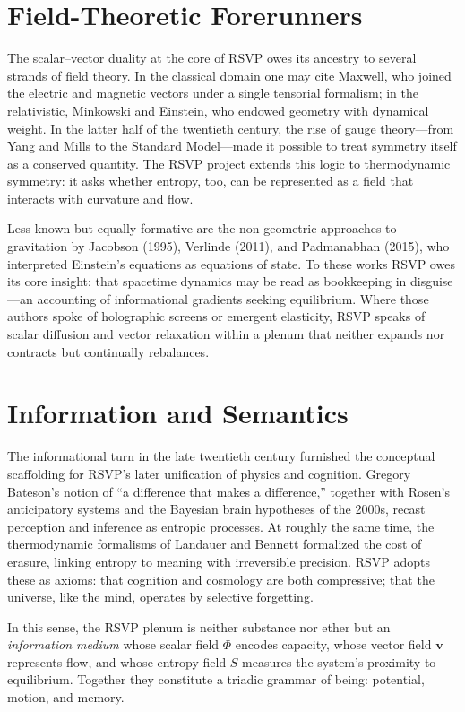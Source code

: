 \documentclass[12pt]{article}
\begin{document}
\section{Field-Theoretic Forerunners}

The scalar--vector duality at the core of RSVP owes its ancestry to several strands of field theory. 
In the classical domain one may cite Maxwell, who joined the electric and magnetic vectors under a single tensorial formalism; in the relativistic, Minkowski and Einstein, who endowed geometry with dynamical weight. 
In the latter half of the twentieth century, the rise of gauge theory---from Yang and Mills to the Standard Model---made it possible to treat symmetry itself as a conserved quantity. 
The RSVP project extends this logic to thermodynamic symmetry: it asks whether entropy, too, can be represented as a field that interacts with curvature and flow.

Less known but equally formative are the non-geometric approaches to gravitation by Jacobson (1995), Verlinde (2011), and Padmanabhan (2015), who interpreted Einstein's equations as equations of state. 
To these works RSVP owes its core insight: that spacetime dynamics may be read as bookkeeping in disguise---an accounting of informational gradients seeking equilibrium. 
Where those authors spoke of holographic screens or emergent elasticity, RSVP speaks of scalar diffusion and vector relaxation within a plenum that neither expands nor contracts but continually rebalances.

\section{Information and Semantics}

The informational turn in the late twentieth century furnished the conceptual scaffolding for RSVP's later unification of physics and cognition. 
Gregory Bateson's notion of ``a difference that makes a difference,'' together with Rosen's anticipatory systems and the Bayesian brain hypotheses of the 2000s, recast perception and inference as entropic processes. 
At roughly the same time, the thermodynamic formalisms of Landauer and Bennett formalized the cost of erasure, linking entropy to meaning with irreversible precision. 
RSVP adopts these as axioms: that cognition and cosmology are both compressive; that the universe, like the mind, operates by selective forgetting.

In this sense, the RSVP plenum is neither substance nor ether but an \textit{information medium} whose scalar field $\Phi$ encodes capacity, whose vector field $\mathbf{v}$ represents flow, and whose entropy field $S$ measures the system's proximity to equilibrium. 
Together they constitute a triadic grammar of being: potential, motion, and memory.
\end{document}
